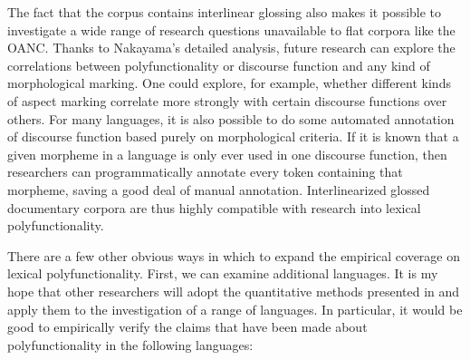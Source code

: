 The fact that the  corpus contains interlinear glossing also makes it possible to investigate a wide range of research questions unavailable to flat corpora like the OANC. Thanks to Nakayama's detailed analysis, future research can explore the correlations between polyfunctionality or discourse function and any kind of morphological marking. One could explore, for example, whether different kinds of aspect marking correlate more strongly with certain discourse functions over others. For many languages, it is also possible to do some automated annotation of discourse function based purely on morphological criteria. If it is known that a given morpheme in a language is only ever used in one discourse function, then researchers can programmatically annotate every token containing that morpheme, saving a good deal of manual annotation. Interlinearized glossed documentary corpora are thus highly compatible with research into lexical polyfunctionality.

There are a few other obvious ways in which to expand the empirical coverage on lexical polyfunctionality. First, we can examine additional languages. It is my hope that other researchers will adopt the quantitative methods presented in  and apply them to the investigation of a range of languages. In particular, it would be good to empirically verify the claims that have been made about polyfunctionality in the following languages:

